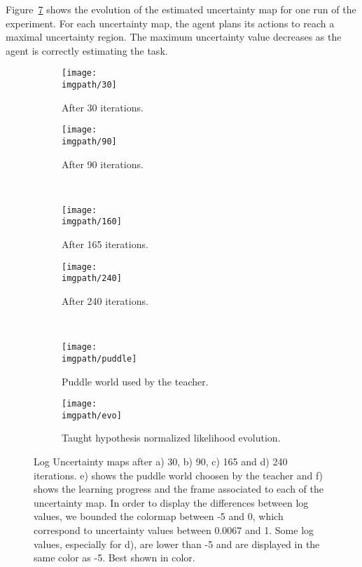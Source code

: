 Figure~\ref{UncertaintyMap} shows the evolution of the estimated uncertainty map for one run of the experiment. For each uncertainty map, the agent plans its actions to reach a maximal uncertainty region. The maximum uncertainty value decreases as the agent is correctly estimating the task.

\begin{figure}[!htbp]
  \centering
      \begin{subfigure}[b]{0.35\columnwidth}
          \centering
          \texttt{[image: \\imgpath/30]}
          \caption{After 30 iterations.}
          \label{fig:30}
      \end{subfigure}
      \begin{subfigure}[b]{0.35\columnwidth}
          \centering
          \texttt{[image: \\imgpath/90]}
          \caption{After 90 iterations.}
          \label{fig:90}
      \end{subfigure}\\
      \begin{subfigure}[b]{0.35\columnwidth}
          \centering
          \texttt{[image: \\imgpath/160]}
          \caption{After 165 iterations.}
          \label{fig:165}
      \end{subfigure}
      \begin{subfigure}[b]{0.35\columnwidth}
          \centering
          \texttt{[image: \\imgpath/240]}
          \caption{After 240 iterations.}
          \label{fig:240}
      \end{subfigure}\\
      \begin{subfigure}[b]{0.25\columnwidth}
          \centering
          \texttt{[image: \\imgpath/puddle]}     
          \caption{Puddle world used by the teacher.}
          \label{fig:puddle}
      \end{subfigure}
      \begin{subfigure}[t]{0.45\columnwidth}
          \centering
          \texttt{[image: \\imgpath/evo]}
          \caption{Taught hypothesis normalized likelihood evolution.}
          \label{fig:evo}
      \end{subfigure}
        
  \caption{Log Uncertainty maps after a) 30, b) 90, c) 165 and d) 240 iterations. e) shows the puddle world choosen by the teacher and f) shows the learning progress and the frame associated to each of the uncertainty map. In order to display the differences between log values, we bounded the colormap between -5 and 0, which correspond to uncertainty values between 0.0067 and 1. Some log values, especially for d), are lower than -5 and are displayed in the same color as -5. Best shown in color.}
  \label{UncertaintyMap}
\end{figure}

